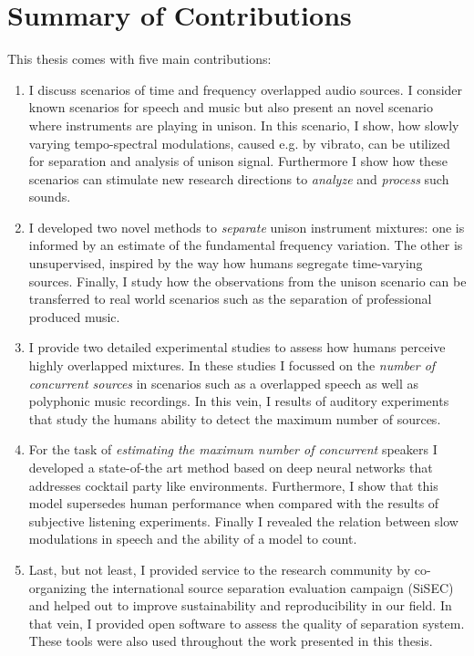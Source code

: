 \clearpage
\section{Summary of Contributions}

This thesis comes with five main contributions:

\begin{enumerate}
\item I discuss scenarios of time and frequency overlapped audio sources.
I consider known scenarios for speech and music but also present an novel scenario where instruments are playing in unison.
In this scenario, I show, how slowly varying tempo-spectral modulations, caused e.g. by vibrato, can be utilized for separation and analysis of unison signal.
Furthermore I show how these scenarios can stimulate new research directions to \emph{analyze} and \emph{process} such sounds.\\

\item I developed two novel methods to \emph{separate} unison instrument mixtures: one is informed by an estimate of the fundamental frequency variation.
The other is unsupervised, inspired by the way how humans segregate time-varying sources.
Finally, I study how the observations from the unison scenario can be transferred to real world scenarios such as the separation of professional produced music.\\

\item I provide two detailed experimental studies to assess how humans perceive highly overlapped mixtures.
In these studies I focussed on the \emph{number of concurrent sources} in scenarios such as a overlapped speech as well as polyphonic music recordings.
In this vein, I results of auditory experiments that study the humans ability to detect the maximum number of sources.\\

\item For the task of \emph{estimating the maximum number of concurrent} speakers I developed a state-of-the art method based on deep neural networks that addresses cocktail party like environments.
Furthermore, I show that this model supersedes human performance when compared with the results of subjective listening experiments.
Finally I revealed the relation between slow modulations in speech and the ability of a model to count. 
\\

\item Last, but not least, I provided service to the research community by co-organizing the international source separation evaluation campaign (SiSEC) and helped out to improve sustainability and reproducibility in our field.
In that vein, I provided open software to assess the quality of separation system. 
These tools were also used throughout the work presented in this thesis.
\end{enumerate}



